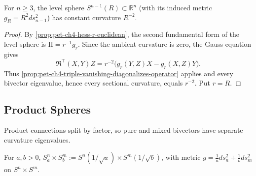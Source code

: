 \begin{proposition}
  \label{prop:pet-ch4-euclidean-sphere-constant-curvature}

  For $n\ge3$, the level sphere $S^{n-1}(R)\subset\mathbb{R}^n$ (with its induced metric
  $g_R=R^2ds_{n-1}^2$) has constant curvature $R^{-2}$.
\end{proposition}
\begin{proof}
  \sketch
  By \cref{prop:pet-ch4-hess-r-euclidean}, the second fundamental form of the
  level sphere is $\mathrm{II}=r^{-1}g_r$. Since the ambient curvature is zero,
  the Gauss equation gives
  \[
    \mathfrak R^\top(X,Y)Z
    =r^{-2}\bigl(g_r(Y,Z)X-g_r(X,Z)Y\bigr).
  \]
  Thus \cref{prop:pet-ch4-triple-vanishing-diagonalizes-operator} applies and
  every bivector eigenvalue, hence every sectional curvature, equals $r^{-2}$.
  Put $r=R$.
\end{proof}

\subsection{Product Spheres}

Product connections split by factor, so pure and mixed bivectors have separate
curvature eigenvalues.

\begin{definition}
  \label{def:pet-ch4-product-sphere-metric}


  For $a,b>0$, $S^n_a\times S^m_b:=S^n(1/\sqrt a)\times S^m(1/\sqrt b)$, with metric
  $g=\tfrac1a ds_n^2+\tfrac1b ds_m^2$ on $S^n\times S^m$.
\end{definition}

